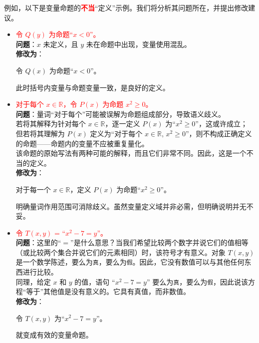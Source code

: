 例如，以下是变量命题的\textcolor{red}{\textbf{不当}}``定义''示例。我们将分析其问题所在，并提出修改建议。
\begin{itemize}
    \item \textcolor{red}{令 $Q(y)$ 为命题``$x < 0$''。}\\
        \textbf{问题}：$x$ 未定义，且 $y$ 未在命题中出现，变量使用混乱。\\
        \textbf{修改为}：
        \begin{center}
            \textcolor{olivegreen}{令 $Q(x)$ 为命题``$x<0$''。}
        \end{center}
        此时括号内变量与命题变量一致，是良好的定义。
    \item \textcolor{red}{对于每个 $x \in \mathbb{R}$，令 $P(x)$ 为命题 $x^2 \ge 0$。}\\
        \textbf{问题}：量词``对于每个''可能被误解为命题组成部分，导致语义歧义。\\
        若将其解释为针对每个 $x \in \mathbb{R}$，逐一定义 $P(x)$ 为``$x^2 \ge 0$''，这或许成立；\\
        但若将其理解为 $P(x)$ 定义为``对于每个 $x \in \mathbb{R}$, $x^2 \ge 0$''，则不构成正确定义的命题——命题内的变量不应被重复量化。\\
        该命题的原始写法有两种可能的解释，而且它们非常不同。因此，这是一个不当的定义。\\
        \textbf{修改为}：
        \begin{center}
            \textcolor{olivegreen}{对于每一个 $x \in \mathbb{R}$，定义 $P(x)$ 为命题``$x^2 \ge 0$''。}
        \end{center}
        明确量词作用范围可消除歧义。虽然变量定义域并非必需，但明确说明并无不妥。
    \item \textcolor{red}{令 $T(x, y)$ = ``$x^2 - 7 = y$''。}\\
        \textbf{问题}：这里的``$=$''是什么意思？当我们希望比较两个数字并说它们的值相等（或比较两个集合并说它们的元素相同）时，该符号才有意义。对象 $T(x, y)$ 是一个数学陈述，要么为\verb|真|，要么为\verb|假|。因此，它没有数值可以与其他任何东西进行比较。\\
        同理，给定 $x$ 和 $y$ 的值，语句 ``$x^2 - 7 = y$'' 要么为\verb|真|，要么为\verb|假|，因此说该方程``等于''其他值是没有意义的。它具有真值，而非数值。\\
        \textbf{修改为}：
        \begin{center}
            \textcolor{olivegreen}{令 $T(x, y)$ 为``$x^2 - 7 = y$''。}
        \end{center}
        就变成有效的变量命题。
\end{itemize}

